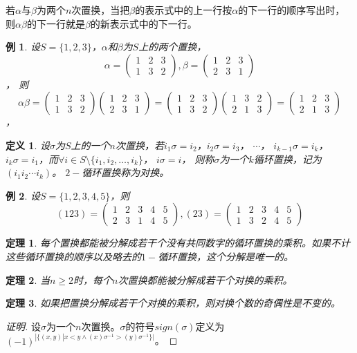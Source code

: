\documentclass{article}
\newtheorem{Def}{定义}
\newtheorem{Thm}{定理}
\newtheorem*{Example}{例}
\begin{document}
\begin{CJK*}{UTF8}{gbsn}
   若$\alpha$与$\beta$为两个$n$次置换，当把$\beta$的表示式中的上一行按$\alpha$的下一行的顺序写出时，则$\alpha \beta$的下一行就是$\beta$的新表示式中的下一行。
  \begin{Example}
    设$S=\{1,2,3\}$，$\alpha$和$\beta$为$S$上的两个置换，
    \[\alpha=\begin{pmatrix}1&2&3\\1&3&2\end{pmatrix},\beta=\begin{pmatrix}1&2&3\\2&3&1\end{pmatrix}\]，
    则
    \[\alpha\beta=\begin{pmatrix}1&2&3\\1&3&2\end{pmatrix}\begin{pmatrix}1&2&3\\2&3&1\end{pmatrix}=\begin{pmatrix}1&2&3\\1&3&2\end{pmatrix}\begin{pmatrix}1&3&2\\2&1&3\end{pmatrix}=\begin{pmatrix}1&2&3\\2&1&3\end{pmatrix}\]，    
  \end{Example}   
   \begin{Def}
     设$\sigma$为$S$上的一个$n$次置换，若$i_1\sigma=i_2$，$i_2\sigma = i_3$， $\cdots$， $i_{k-1}\sigma = i_k$， $i_k\sigma = i_1$，而$\forall i \in S\setminus \{i_1, i_2, \ldots, i_k\}$， $i\sigma = i$，
     则称$\sigma$为一个$k$循环置换，记为$(i_1i_2\cdots i_k)$。 $2-$循环置换称为对换。
   \end{Def}
   \begin{Example}
   设$S=\{1,2,3,4,5\}$，则\[(1 2 3)=\begin{pmatrix}1&2&3&4&5\\2&3&1&4&5\end{pmatrix},(2 3)=\begin{pmatrix}1&2&3&4&5\\1&3&2&4&5\end{pmatrix}\]     
   \end{Example}
   \begin{Thm}
    每个置换都能被分解成若干个没有共同数字的循环置换的乘积。如果不计这些循环置换的顺序以及略去的$1-$循环置换，这个分解是唯一的。
   \end{Thm}
   \begin{Thm}
    当$n\geq 2$时，每个$n$次置换都能被分解成若干个对换的乘积。
   \end{Thm}
   \begin{Thm}
    如果把置换分解成若干个对换的乘积，则对换个数的奇偶性是不变的。
  \end{Thm}
  \begin{proof}[证明]
    设$\sigma$为一个$n$次置换。$\sigma$的符号$sign(\sigma)$定义为$(-1)^{|\{(x,y)|x < y \land (x)\sigma^{-1} > (y)\sigma^{-1} \}|}$。


\end{proof}
\end{CJK*}
\end{document}
